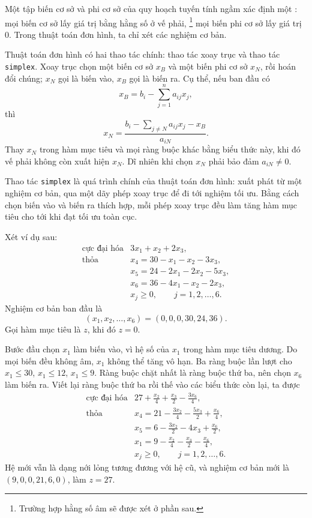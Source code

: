 \documentclass[11pt]{article}
\begin{document}
Một tập biến cơ sở và phi cơ sở của quy hoạch tuyến tính ngầm xác định một
: mọi biến cơ sở lấy giá trị bằng hằng số ở vế phải,
\footnote{Trường hợp hằng số âm sẽ được xét ở phần sau.} mọi biến phi cơ sở
lấy giá trị \(0\). Trong thuật toán đơn hình, ta chỉ xét các nghiệm cơ bản.

Thuật toán đơn hình có hai thao tác chính: thao tác xoay trục và thao tác
\texttt{simplex}. Xoay trục chọn một biến cơ sở \(x_B\) và một biến phi cơ sở
\(x_N\), rồi hoán đổi chúng; \(x_N\) gọi là biến vào, \(x_B\) gọi là biến ra.
Cụ thể, nếu ban đầu có
\[
  x_B=b_i-\sum_{j=1}^{n}a_{ij}x_j,
\]
thì
\[
  x_N=\frac{b_i-\sum_{j\ne N}a_{ij}x_j-x_B}{a_{iN}}.
\]
Thay \(x_N\) trong hàm mục tiêu và mọi ràng buộc khác bằng biểu thức này, khi
đó vế phải không còn xuất hiện \(x_N\). Dĩ nhiên khi chọn \(x_N\) phải bảo
đảm \(a_{iN}\ne 0\).

Thao tác \texttt{simplex} là quá trình chính của thuật toán đơn hình: xuất
phát từ một nghiệm cơ bản, qua một dãy phép xoay trục để đi tới nghiệm tối
ưu. Bằng cách chọn biến vào và biến ra thích hợp, mỗi phép xoay trục đều làm
tăng hàm mục tiêu cho tới khi đạt tối ưu toàn cục.

Xét ví dụ sau:
\[
\begin{array}{ll}
\text{cực đại hóa} & 3x_1+x_2+2x_3,\\
\text{thỏa} & x_4=30-x_1-x_2-3x_3,\\
& x_5=24-2x_1-2x_2-5x_3,\\
& x_6=36-4x_1-x_2-2x_3,\\
& x_j\ge 0,\qquad j=1,2,\ldots,6.
\end{array}\tag{3.1}
\]
Nghiệm cơ bản ban đầu là
\[
  (x_1,x_2,\ldots,x_6)=(0,0,0,30,24,36).
\]
Gọi hàm mục tiêu là \(z\), khi đó \(z=0\).

Bước đầu chọn \(x_1\) làm biến vào, vì hệ số của \(x_1\) trong hàm mục tiêu
dương. Do mọi biến đều không âm, \(x_1\) không thể tăng vô hạn. Ba ràng buộc
lần lượt cho \(x_1\le 30\), \(x_1\le 12\), \(x_1\le 9\). Ràng buộc chặt nhất
là ràng buộc thứ ba, nên chọn \(x_6\) làm biến ra. Viết lại ràng buộc thứ ba
rồi thế vào các biểu thức còn lại, ta được
\[
\begin{array}{ll}
\text{cực đại hóa} &
  27+\frac{x_2}{4}+\frac{x_3}{2}-\frac{3x_6}{4},\\[0.4em]
\text{thỏa} &
  x_4=21-\frac{3x_2}{4}-\frac{5x_3}{2}+\frac{x_6}{4},\\[0.4em]
& x_5=6-\frac{3x_2}{2}-4x_3+\frac{x_6}{2},\\[0.4em]
& x_1=9-\frac{x_2}{4}-\frac{x_3}{2}-\frac{x_6}{4},\\[0.4em]
& x_j\ge 0,\qquad j=1,2,\ldots,6.
\end{array}
\]
Hệ mới vẫn là dạng nới lỏng tương đương với hệ cũ, và nghiệm cơ bản mới là
\((9,0,0,21,6,0)\), làm \(z=27\).
\end{document}
